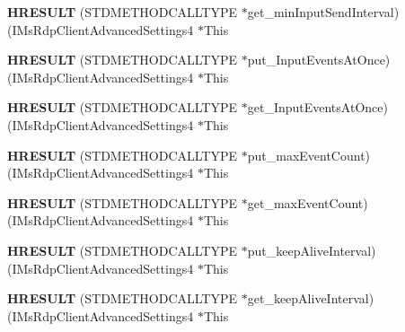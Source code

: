 \begin{DoxyCompactItemize}
{\bfseries H\+R\+E\+S\+U\+LT} (S\+T\+D\+M\+E\+T\+H\+O\+D\+C\+A\+L\+L\+T\+Y\+PE $\ast$get\+\_\+min\+Input\+Send\+Interval)(I\+Ms\+Rdp\+Client\+Advanced\+Settings4 $\ast$This
\item 
\mbox{\label{struct_i_ms_rdp_client_advanced_settings4_vtbl_a3a45a9409a850f2df068971b5ccf5e60}} 
{\bfseries H\+R\+E\+S\+U\+LT} (S\+T\+D\+M\+E\+T\+H\+O\+D\+C\+A\+L\+L\+T\+Y\+PE $\ast$put\+\_\+\+Input\+Events\+At\+Once)(I\+Ms\+Rdp\+Client\+Advanced\+Settings4 $\ast$This
\item 
\mbox{\label{struct_i_ms_rdp_client_advanced_settings4_vtbl_a1aaa1aad774a194c851dd3cac7b38408}} 
{\bfseries H\+R\+E\+S\+U\+LT} (S\+T\+D\+M\+E\+T\+H\+O\+D\+C\+A\+L\+L\+T\+Y\+PE $\ast$get\+\_\+\+Input\+Events\+At\+Once)(I\+Ms\+Rdp\+Client\+Advanced\+Settings4 $\ast$This
\item 
\mbox{\label{struct_i_ms_rdp_client_advanced_settings4_vtbl_a12e633f6c378054729a602518bfbf6e9}} 
{\bfseries H\+R\+E\+S\+U\+LT} (S\+T\+D\+M\+E\+T\+H\+O\+D\+C\+A\+L\+L\+T\+Y\+PE $\ast$put\+\_\+max\+Event\+Count)(I\+Ms\+Rdp\+Client\+Advanced\+Settings4 $\ast$This
\item 
\mbox{\label{struct_i_ms_rdp_client_advanced_settings4_vtbl_a054034e16437dce2f26dc5c0b756560e}} 
{\bfseries H\+R\+E\+S\+U\+LT} (S\+T\+D\+M\+E\+T\+H\+O\+D\+C\+A\+L\+L\+T\+Y\+PE $\ast$get\+\_\+max\+Event\+Count)(I\+Ms\+Rdp\+Client\+Advanced\+Settings4 $\ast$This
\item 
\mbox{\label{struct_i_ms_rdp_client_advanced_settings4_vtbl_addf7ab7f4a018982390e8b289b9bb917}} 
{\bfseries H\+R\+E\+S\+U\+LT} (S\+T\+D\+M\+E\+T\+H\+O\+D\+C\+A\+L\+L\+T\+Y\+PE $\ast$put\+\_\+keep\+Alive\+Interval)(I\+Ms\+Rdp\+Client\+Advanced\+Settings4 $\ast$This
\item 
\mbox{\label{struct_i_ms_rdp_client_advanced_settings4_vtbl_a57f37bf6c902b632d2842cdca290e2e7}} 
{\bfseries H\+R\+E\+S\+U\+LT} (S\+T\+D\+M\+E\+T\+H\+O\+D\+C\+A\+L\+L\+T\+Y\+PE $\ast$get\+\_\+keep\+Alive\+Interval)(I\+Ms\+Rdp\+Client\+Advanced\+Settings4 $\ast$This

\end{DoxyCompactItemize}
